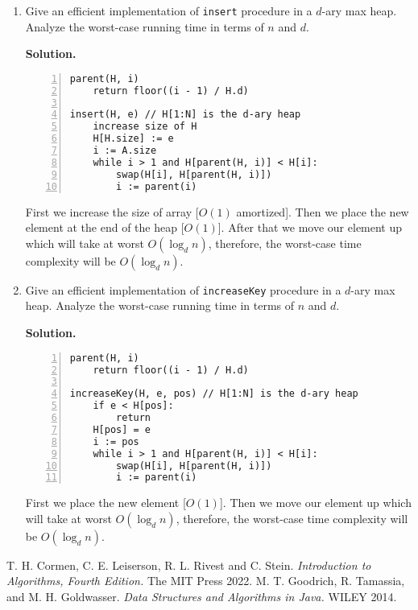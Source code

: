 \documentclass{article}
\begin{document}
\begin{enumerate}
    \item Give an efficient implementation of \texttt{insert} procedure in a $d$-ary max heap. Analyze the worst-case running time in terms of $n$ and $d$.

    \textbf{Solution.}

\begin{lstlisting}[numbers=left,language={},style=pseudo,mathescape=true,firstnumber=1]
parent(H, i)
    return floor((i - 1) / H.d)

insert(H, e) // H[1:N] is the d-ary heap
    increase size of H
    H[H.size] := e
    i := A.size
    while i > 1 and H[parent(H, i)] < H[i]:
        swap(H[i], H[parent(H, i)])
        i := parent(i)
\end{lstlisting}

    First we increase the size of array [$O(1)$ amortized]. Then we place the new element at the end of the heap [$O(1)$]. After that we move our element up which will take at worst $O(\log_d{n})$, therefore, the worst-case time complexity will be $O(\log_d{n})$.
    
    \item Give an efficient implementation of \texttt{increaseKey} procedure in a $d$-ary max heap. Analyze the worst-case running time in terms of $n$ and $d$.

    \textbf{Solution.}

\begin{lstlisting}[numbers=left,language={},style=pseudo,mathescape=true,firstnumber=1]
parent(H, i)
    return floor((i - 1) / H.d)

increaseKey(H, e, pos) // H[1:N] is the d-ary heap
    if e < H[pos]:
        return
    H[pos] = e
    i := pos
    while i > 1 and H[parent(H, i)] < H[i]:
        swap(H[i], H[parent(H, i)])
        i := parent(i)
\end{lstlisting}

    First we place the new element [$O(1)$]. Then we move our element up which will take at worst $O(\log_d{n})$, therefore, the worst-case time complexity will be $O(\log_d{n})$.
    
\end{enumerate}

\begin{thebibliography}{9}
  T. H. Cormen, C. E. Leiserson, R. L. Rivest and C. Stein.
  \textit{Introduction to Algorithms, Fourth Edition.}
  The MIT Press
  2022.
  M. T. Goodrich, R. Tamassia, and M. H. Goldwasser.
  \textit{Data Structures and Algorithms in Java.}
  WILEY
  2014.
\end{thebibliography}
\end{document}
